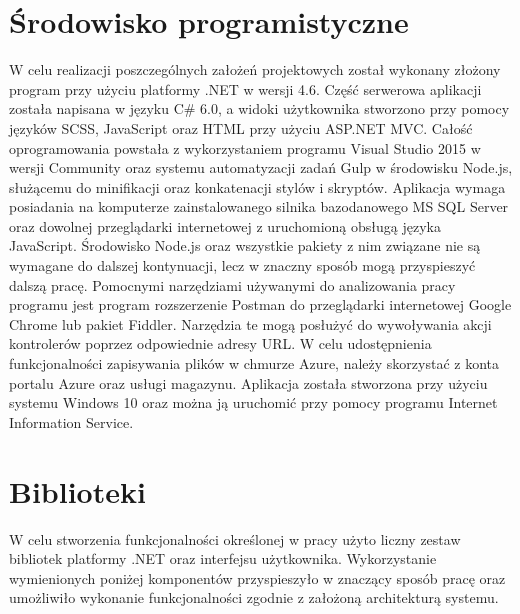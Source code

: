 \section{Środowisko programistyczne}
W celu realizacji poszczególnych założeń projektowych został wykonany złożony program przy użyciu platformy .NET w wersji 4.6. Część serwerowa aplikacji została napisana w języku C\# 6.0, a widoki użytkownika stworzono przy pomocy języków SCSS, JavaScript oraz HTML przy użyciu ASP.NET MVC. Całość oprogramowania powstała z wykorzystaniem programu Visual Studio 2015\cite{MicrosoftVS} w wersji Community oraz systemu automatyzacji zadań Gulp\cite{Gulp:limitation} w środowisku Node.js, służącemu do minifikacji oraz konkatenacji stylów i skryptów. Aplikacja wymaga posiadania na komputerze zainstalowanego silnika bazodanowego MS SQL Server oraz dowolnej przeglądarki internetowej z uruchomioną obsługą języka JavaScript. Środowisko Node.js oraz wszystkie pakiety z nim związane nie są wymagane do dalszej kontynuacji, lecz w znaczny sposób mogą przyspieszyć dalszą pracę. Pomocnymi narzędziami używanymi do analizowania pracy programu jest program rozszerzenie Postman\cite{Postman:limitation} do przeglądarki internetowej Google Chrome lub pakiet Fiddler\cite{Fiddler:limitation}. Narzędzia te mogą posłużyć do wywoływania akcji kontrolerów poprzez odpowiednie adresy URL. W celu udostępnienia funkcjonalności zapisywania plików w chmurze Azure, należy skorzystać z konta portalu Azure oraz usługi magazynu. Aplikacja została stworzona przy użyciu systemu Windows 10 oraz można ją uruchomić przy pomocy programu Internet Information Service\cite{IIS:limitation}.

\newpage

\section{Biblioteki}

W celu stworzenia funkcjonalności określonej w pracy użyto liczny zestaw bibliotek platformy .NET oraz interfejsu użytkownika. Wykorzystanie wymienionych poniżej komponentów przyspieszyło w znaczący sposób pracę oraz umożliwiło wykonanie funkcjonalności zgodnie z założoną architekturą systemu.

